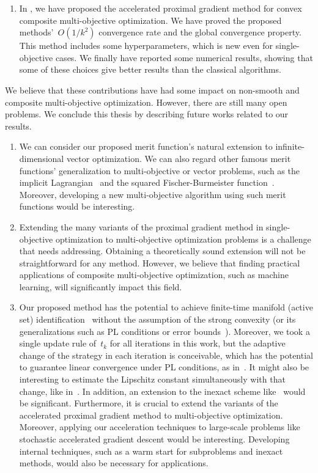\documentclass[../main]{subfiles}
\begin{document}
\begin{enumerate}
    \item In , we have proposed the accelerated proximal gradient method for convex composite multi-objective optimization.
        We have proved the proposed methods'~$O(1 / k^2)$ convergence rate and the global convergence property.
        This method includes some hyperparameters, which is new even for single-objective cases.
        We finally have reported some numerical results, showing that some of these choices give better results than the classical algorithms.
\end{enumerate}

We believe that these contributions have had some impact on non-smooth and composite multi-objective optimization.
However, there are still many open problems.
We conclude this thesis by describing future works related to our results.
\begin{enumerate}
    \item We can consider our proposed merit function's natural extension to infinite-dimensional vector optimization.
        We can also regard other famous merit functions' generalization to multi-objective or vector problems, such as the implicit Lagrangian~\cite{Mangasarian1993} and the squared Fischer-Burmeister function~\cite{Kanzow1996}.
        Moreover, developing a new multi-objective algorithm using such merit functions would be interesting.

    \item Extending the many variants of the proximal gradient method in single-objective optimization to multi-objective optimization problems is a challenge that needs addressing.
        Obtaining a theoretically sound extension will not be straightforward for any method.
        However, we believe that finding practical applications of composite multi-objective optimization, such as machine learning, will significantly impact this field.

    \item Our proposed method has the potential to achieve finite-time manifold (active set) identification~\cite{Sun2019} without the assumption of the strong convexity (or its generalizations such as PL conditions or error bounds~\cite{Karimi2016}).
        Moreover, we took a single update rule of~$t_k$ for all iterations in this work, but the adaptive change of the strategy in each iteration is conceivable, which has the potential to guarantee linear convergence under PL conditions, as in~\cite{Aujol2021}.
        It might also be interesting to estimate the Lipschitz constant simultaneously with that change, like in~\cite{Scheinberg2014}.
        In addition, an extension to the inexact scheme like~\cite{Villa2013} would be significant.
        Furthermore, it is crucial to extend the variants of the accelerated proximal gradient method to multi-objective optimization.
        Moreover, applying our acceleration techniques to large-scale problems like stochastic accelerated gradient descent would be interesting.
        Developing internal techniques, such as a warm start for subproblems and inexact methods, would also be necessary for applications.
\end{enumerate}
\end{document}
